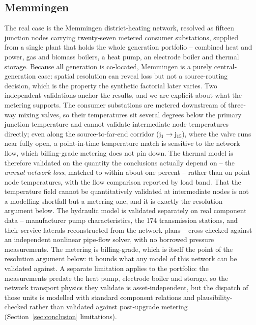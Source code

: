 \documentclass[a4paper,fleqn]{cas-dc}
\begin{document}
\subsection{Memmingen}
The real case is the Memmingen district-heating network, resolved as fifteen junction nodes
carrying twenty-seven metered consumer substations, supplied from a single plant that holds
the whole generation portfolio -- combined heat and power, gas and biomass boilers, a heat
pump, an electrode boiler and thermal storage. Because all generation is co-located, Memmingen
is a purely central-generation case: spatial resolution can reveal loss but not a source-routing
decision, which is the property the synthetic factorial later varies. Two independent
validations anchor the results, and we are explicit about what the metering supports. The
consumer substations are metered downstream of three-way mixing valves, so their temperatures
sit several degrees below the primary junction temperature and cannot validate intermediate node
temperatures directly; even along the source-to-far-end corridor (j$_1\to$j$_{15}$), where the
valve runs near fully open, a point-in-time temperature match is sensitive to the network flow,
which billing-grade metering does not pin down. The thermal model is therefore validated on the
quantity the conclusions actually depend on -- the \emph{annual network loss}, matched to within
about one percent -- rather than on point node temperatures, with the flow comparison reported by
load band. That the temperature field cannot be quantitatively validated at intermediate nodes is
not a modelling shortfall but a metering one, and it is exactly the resolution argument below. The hydraulic model is
validated separately on real component data -- manufacturer pump characteristics, the 174
transmission stations, and their service laterals reconstructed from the network plans --
cross-checked against an independent nonlinear pipe-flow solver, with no borrowed pressure
measurements. The metering is billing-grade, which is itself the point of the resolution
argument below: it bounds what any model of this network can be validated against. A separate
limitation applies to the portfolio: the measurements predate the heat pump, electrode boiler
and storage, so the network transport physics they validate is asset-independent, but the
dispatch of those units is modelled with standard component relations and plausibility-checked
rather than validated against post-upgrade metering (Section~\ref{sec:conclusion} limitations).

\end{document}

